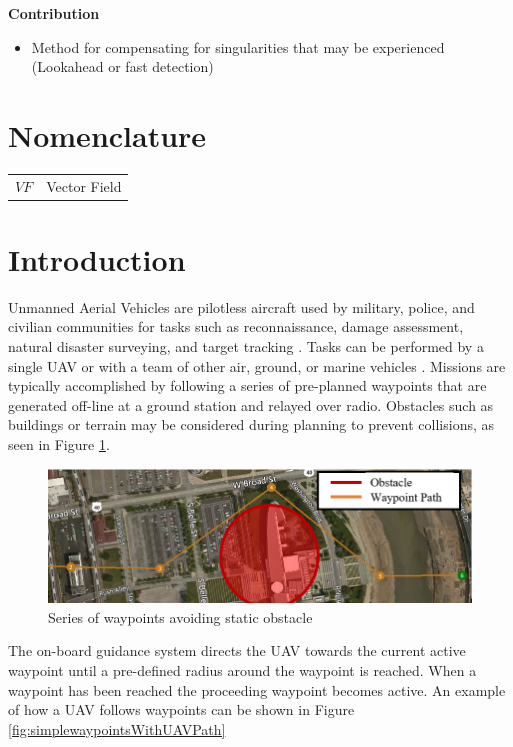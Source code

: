 \documentclass[conf]{new-aiaa}
\begin{document}
\textbf{Contribution}
\begin{itemize}
	\item Method for compensating for singularities that may be experienced (Lookahead or fast detection)
\end{itemize}




\section{Nomenclature}

{\renewcommand\arraystretch{1.0}
\noindent\begin{longtable*}{@{}l @{\quad=\quad} l@{}}
$VF$  & Vector Field \\
\end{longtable*}}

\section{Introduction}
Unmanned Aerial Vehicles are pilotless aircraft used by military, police, and civilian communities for tasks such as reconnaissance, damage assessment, natural disaster surveying, and target tracking \cite{ariyur_autonomous_2008,teuliere_chasing_2011}. Tasks can be performed by a single UAV or with a team of other air, ground, or marine vehicles \cite{oh_coordinated_2013,hyondong_oh_coordinated_2015,ulun_coordinated_2013}. Missions are typically accomplished by following a series of pre-planned waypoints that are generated off-line at a ground station and relayed over radio. Obstacles such as buildings or terrain may be considered during planning to prevent collisions, as seen in Figure \ref{fig:simplewaypoints}. 

\begin{figure}[H]
	\centering
	\includegraphics[width=0.7\linewidth]{Figures/simpleWaypoints}
	\caption{Series of waypoints avoiding static obstacle}
	\label{fig:simplewaypoints}
\end{figure}

The on-board guidance system directs the UAV towards the current active waypoint until a pre-defined radius around the waypoint is reached. When a waypoint has been reached the proceeding waypoint becomes active. An example of how a UAV follows waypoints can be shown in Figure \ref{fig:simplewaypointsWithUAVPath}
\end{document}
